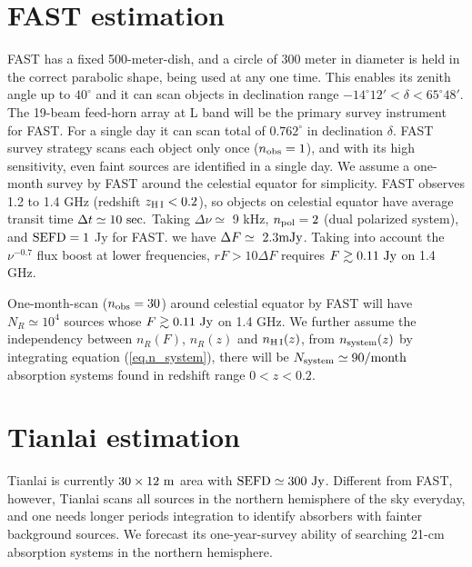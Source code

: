 \documentclass[]{raa}
\newcommand{\HI}{{H{\small\,I}}}
\begin{document}
\section{FAST estimation}\label{sec.FAST}

FAST has a fixed 500-meter-dish, and a circle of 300 meter in diameter is held
in the correct parabolic shape, being used at any one time. This
enables its zenith angle up to $40^\circ$ and it can scan objects
in declination range $-14^\circ 12'<\delta<65^\circ 48'$.
The 19-beam feed-horn array at L band will be the primary survey
instrument for FAST. For a single day it can scan total of $0.762^\circ$
in declination $\delta$. FAST survey strategy scans each object
only once ($n_{\rm obs}=1$), and with its high sensitivity,
even faint sources are identified in a single day. 
We assume a one-month survey by FAST
around the celestial equator for simplicity. FAST observes
1.2 to 1.4 GHz (redshift $z_{\rm \HI}<0.2$), so objects on celestial equator
have average transit time $\Delta t \simeq 10\ {\rm sec.}$
Taking $\Delta\nu\simeq$ 9 kHz, $n_{\rm pol}=2$
(dual polarized system), and
${\rm SEFD}=1$ Jy for FAST.
we have $\Delta F \simeq\ 2.3 {\rm mJy}$.
Taking into account the $\nu^{-0.7}$ flux boost at lower
frequencies, $rF>10\Delta F$ requires $F\gtrsim 0.11\ {\rm Jy}$ on 1.4 GHz.

One-month-scan ($n_{\rm obs}=30$) around celestial equator by FAST will have
$N_R\simeq 10^4$ sources whose $F\gtrsim 0.11\ {\rm Jy}$ on 1.4 GHz.
We further assume the independency between $n_R(F)$, $n_R(z)$
and $n_{\rm\HI}(z)$, from $n_{\rm system}(z)$ by integrating
equation (\ref{eq.n_system}), there will be $N_{\rm system}\simeq 90 {\rm /month}$ absorption
systems found in redshift range $0<z<0.2$.


\section{Tianlai estimation}\label{sec.Tianlai}

Tianlai is currently $30\times 12\ {\rm m}$ area with
${\rm SEFD}\simeq 300\ {\rm Jy}$. Different from FAST, however,
Tianlai scans all sources in the northern hemisphere of the sky
everyday, and one needs longer periods integration to
identify absorbers with fainter background sources.
We forecast its one-year-survey ability of searching 21-cm
absorption systems in the northern hemisphere.
\end{document}

